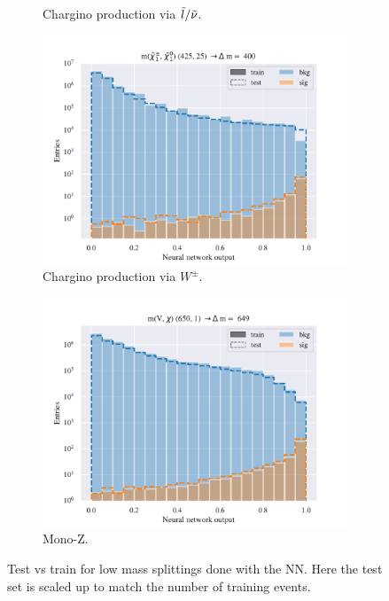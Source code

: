 \begin{figure}[H]
\begin{subfigure}[t!]{0.49\textwidth}
        \caption{Chargino production via $\Tilde{l}/\Tilde{\nu}$.}
        \label{fig:SlepsnuNNLow}
    \end{subfigure}    
    \begin{subfigure}[t!]{0.49\textwidth}
        \includegraphics[width = \textwidth]{Figures/WW/NN/Low_level/High/scaled_train_test_395330.pdf}
        \caption{Chargino production via $W^\pm$.}
        \label{fig:WWNNLow}
    \end{subfigure}
    \begin{subfigure}[t!]{0.49\textwidth}
        \includegraphics[width = \textwidth]{Figures/Mono_Z/ML/NN/Low_level/High/scaled_train_test_310617.pdf}
        \caption{Mono-Z.}
        \label{fig:MonoZNNLow}
    \end{subfigure}
    \caption{Test vs train for low mass splittings done with the NN. Here the test set is scaled up to match the number of training events.}
    \label{fig:AllLowNN}
\end{figure}


